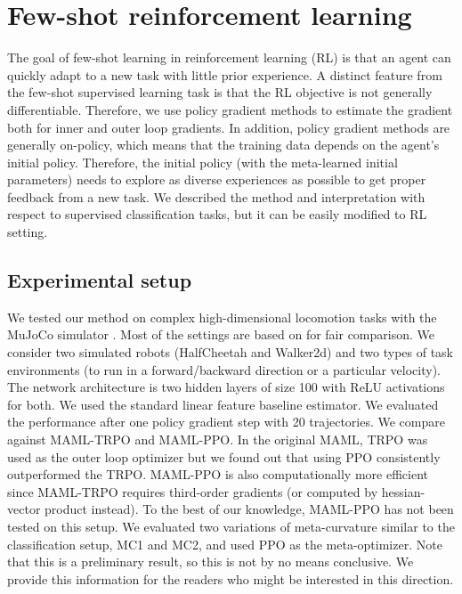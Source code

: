 \documentclass{article}
\begin{document}
\section{Few-shot reinforcement learning}

The goal of few-shot learning in reinforcement learning (RL) is that an agent can quickly adapt to a new task with little prior experience. A distinct feature from the few-shot supervised learning task is that the RL objective is not generally differentiable. Therefore, we use policy gradient methods to estimate the gradient both for inner and outer loop gradients. In addition, policy gradient methods are generally on-policy, which means that the training data depends on the agent’s initial policy. Therefore, the initial policy (with the meta-learned initial parameters) needs to explore as diverse experiences as possible to get proper feedback from a new task. We described the method and interpretation with respect to supervised classification tasks, but it can be easily modified to RL setting. 

\subsection{Experimental setup}
We tested our method on complex high-dimensional locomotion tasks with the MuJoCo simulator \cite{mujoco}. Most of the settings are based on \cite{Finn-icml-2017} for fair comparison. We consider two simulated robots (HalfCheetah and Walker2d) and two types of task environments (to run in a forward/backward direction or a particular velocity). The network architecture is two hidden layers of size 100 with ReLU activations for both. We used the standard linear feature baseline estimator. We evaluated the performance after one policy gradient step with 20 trajectories. We compare against MAML-TRPO and MAML-PPO. In the original MAML, TRPO \cite{trpo} was used as the outer loop optimizer but we found out that using PPO \cite{ppo} consistently outperformed the TRPO. MAML-PPO is also computationally more efficient since MAML-TRPO requires third-order gradients (or computed by hessian-vector product instead). To the best of our knowledge, MAML-PPO has not been tested on this setup. We evaluated two variations of meta-curvature similar to the classification setup, MC1 and MC2, and used PPO as the meta-optimizer. Note that this is a preliminary result, so this is not by no means conclusive. We provide this information for the readers who might be interested in this direction.
\end{document}
